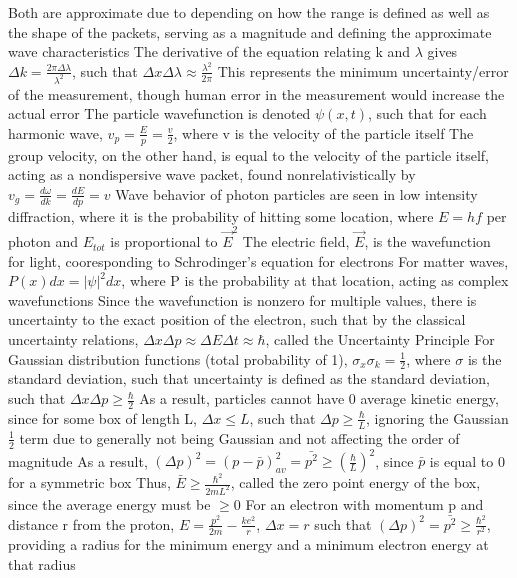\documentclass[11 pt, twoside]{article}
\newenvironment{outline*}
{
	\begin{outline}[enumerate]
	}
	{\end{outline}
}
\begin{document}
\begin{outline*}
		\3 Both are approximate due to depending on how the range is defined as well as the shape of the packets, serving as a magnitude and defining the approximate wave characteristics
		\3 The derivative of the equation relating k and $\lambda$ gives $\Delta k = \frac{2\pi \Delta \lambda}{\lambda^2}$, such that $\Delta x \Delta \lambda \approx \frac{\lambda^2}{2\pi}$
		\3 This represents the minimum uncertainty/error of the measurement, though human error in the measurement would increase the actual error
	\2 The particle wavefunction is denoted $\psi(x, t)$, such that for each harmonic wave, $v_p = \frac{E}{p} = \frac{v}{2}$, where v is the velocity of the particle itself
		\3 The group velocity, on the other hand, is equal to the velocity of the particle itself, acting as a nondispersive wave packet, found nonrelativistically by $v_g = \frac{d\omega}{dk} = \frac{dE}{dp} = v$
	\2 Wave behavior of photon particles are seen in low intensity diffraction, where it is the probability of hitting some location, where $E = hf$ per photon and $E_{tot}$ is proportional to $\vec{E}^2$
		\3 The electric field, $\vec{E}$, is the wavefunction for light, cooresponding to Schrodinger's equation for electrons
		\3 For matter waves, $P(x)dx = |\psi|^2dx$, where P is the probability at that location, acting as complex wavefunctions
\1 Since the wavefunction is nonzero for multiple values, there is uncertainty to the exact position of the electron, such that by the classical uncertainty relations, $\Delta x \Delta p \approx \Delta E \Delta t \approx \hbar$, called the Uncertainty Principle
	\2 For Gaussian distribution functions (total probability of 1), $\sigma_x \sigma_k = \frac{1}{2}$, where $\sigma$ is the standard deviation, such that uncertainty is defined as the standard deviation, such that $\Delta x \Delta p \geq \frac{\hbar}{2}$
	\2 As a result, particles cannot have 0 average kinetic energy, since for some box of length L, $\Delta x \leq L$, such that $\Delta p \geq \frac{\hbar}{L}$, ignoring the Gaussian $\frac{1}{2}$ term due to generally not being Gaussian and not affecting the order of magnitude
		\3 As a result, $(\Delta p)^2 = (p - \bar{p})^2_{av} = \bar{p^2} \geq (\frac{\hbar}{L})^2$, since $\bar{p}$ is equal to 0 for a symmetric box
		\3 Thus, $\bar{E} \geq \frac{\hbar^2}{2mL^2}$, called the zero point energy of the box, since the average energy must be $\geq 0$
	\2 For an electron with momentum p and distance r from the proton, $E = \frac{p^2}{2m} - \frac{ke^2}{r}$, $\Delta x = r$ such that $(\Delta p)^2 = \bar{p^2} \geq \frac{\hbar^2}{r^2}$, providing a radius for the minimum energy and a minimum electron energy at that radius

\end{outline*}
\end{document}
